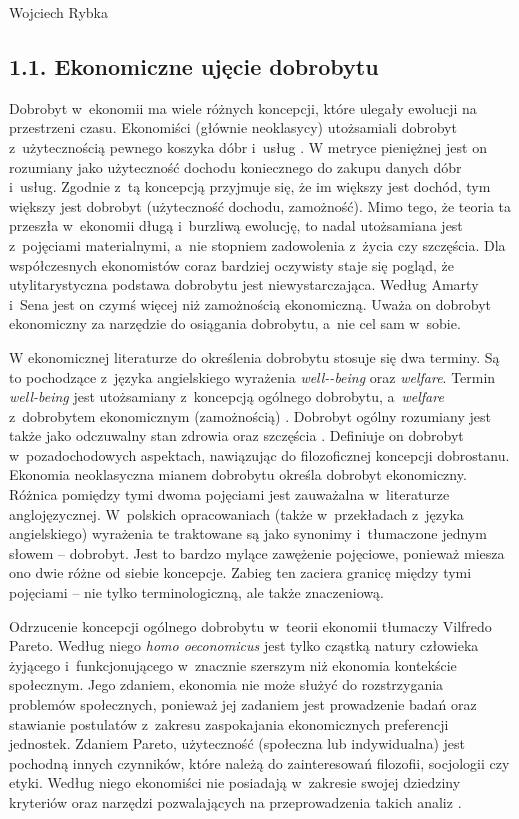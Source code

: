 \begin{artplenv}{Wojciech Rybka}
\subsection{1.1. Ekonomiczne ujęcie dobrobytu}
Dobrobyt w~ekonomii ma wiele różnych koncepcji, które ulegały ewolucji na przestrzeni czasu. Ekonomiści (głównie
neoklasycy) utożsamiali dobrobyt z~użytecznością pewnego koszyka dóbr i~usług
\parencite{kot_dobrobyt_2004}.
W metryce pieniężnej jest on rozumiany jako użyteczność dochodu koniecznego do zakupu danych dóbr i~usług.
Zgodnie z~tą koncepcją przyjmuje się, że im większy jest dochód, tym większy jest dobrobyt (użyteczność dochodu,
zamożność). Mimo tego, że teoria ta przeszła w~ekonomii długą  i~burzliwą ewolucję, to nadal utożsamiana
jest z~pojęciami materialnymi, a~nie stopniem zadowolenia z~życia czy szczęścia. Dla współczesnych ekonomistów coraz bardziej
oczywisty staje się pogląd, że utylitarystyczna podstawa dobrobytu jest niewystarczająca. Według Amarty i~Sena jest on
czymś więcej niż zamożnością ekonomiczną. Uważa on dobrobyt ekonomiczny za narzędzie do osiągania dobrobytu, a~nie cel
sam w~sobie. 

W ekonomicznej literaturze do określenia dobrobytu stosuje się dwa terminy. Są to pochodzące z~języka angielskiego
wyrażenia \textit{well-\mbox{-being}} oraz \textit{welfare}. Termin \textit{well-being} jest utożsamiany z~koncepcją ogólnego
dobrobytu, a~\textit{welfare} z~dobrobytem ekonomicznym (zamożnością)
\parencite{kot_dobrobyt_2004}.
Dobrobyt ogólny rozumiany jest także jako odczuwalny stan zdrowia oraz szczęścia
\parencite{noauthor_well-being_2019}.
Definiuje on dobrobyt w~pozadochodowych aspektach, nawiązując do filozoficznej koncepcji dobrostanu. Ekonomia
neoklasyczna mianem dobrobytu określa dobrobyt ekonomiczny. Różnica pomiędzy tymi dwoma pojęciami jest
zauważalna w~literaturze anglojęzycznej. W~polskich opracowaniach (także w~przekładach z~języka angielskiego) wyrażenia te
traktowane są jako synonimy  i~tłumaczone jednym słowem -- dobrobyt. Jest to bardzo mylące zawężenie pojęciowe, ponieważ
miesza ono dwie różne od siebie koncepcje. Zabieg ten zaciera granicę między tymi pojęciami -- nie tylko terminologiczną,
ale także znaczeniową.

Odrzucenie koncepcji ogólnego dobrobytu w~teorii ekonomii tłumaczy Vilfredo Pareto. Według niego \textit{homo
oeconomicus} jest tylko cząstką natury człowieka żyjącego  i~funkcjonującego w~znacznie szerszym niż ekonomia
kontekście społecznym. Jego zdaniem, ekonomia nie może służyć do rozstrzygania problemów społecznych, ponieważ jej
zadaniem jest prowadzenie badań oraz stawianie postulatów z~zakresu zaspokajania ekonomicznych preferencji jednostek.
Zdaniem Pareto, użyteczność (społeczna lub indywidualna) jest pochodną innych czynników, które należą do zainteresowań
filozofii, socjologii czy etyki. Według niego ekonomiści nie posiadają w~zakresie swojej dziedziny kryteriów oraz
narzędzi pozwalających na przeprowadzenia takich analiz
\parencite{czech_ekonomia_2014}.


\end{artplenv}
